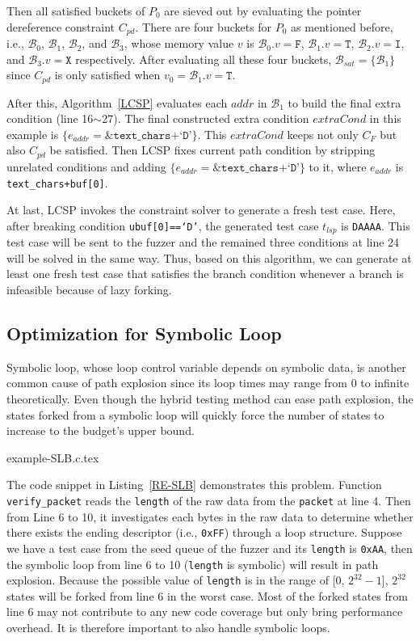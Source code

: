 \documentclass{cta-author}
\begin{document}
Then all satisfied buckets of $P_0$ are sieved out by evaluating the 
pointer dereference constraint $C_{pd}$. 
There are four buckets for $P_0$ as mentioned before, i.e., $\mathcal{B}_0$, $\mathcal{B}_1$, $\mathcal{B}_2$, and $\mathcal{B}_3$, whose memory value
$v$ is $\mathcal{B}_0.v=\texttt{F}$, $\mathcal{B}_1.v=\texttt{T}$, $\mathcal{B}_2.v=\texttt{I}$, and $\mathcal{B}_3.v=\texttt{X}$ respectively. 
After evaluating all these four buckets, $\mathcal{B}_{sat}=\{\mathcal{B}_1\}$ since
$C_{pd}$ is only satisfied when $v_0 = \mathcal{B}_1.v=\texttt{T}$.

After this, Algorithm~\ref{LCSP} evaluates each $addr$ in $\mathcal{B}_1$ to build the final extra condition (line 16$\sim$27). The final constructed extra
condition $extraCond$ in this example is $\{e_{addr} = \texttt{\&text\_chars+`D'}\}$.
This $extraCond$ keeps not only $C_F$ but also $C_{pd}$ be satisfied.
Then LCSP fixes current path condition by stripping unrelated conditions and adding
$\{e_{addr} = \texttt{\&text\_chars+`D'}\}$ to it, where $e_{addr}$ is \texttt{text\_chars+buf[0]}.

At last, LCSP invokes the constraint solver to 
generate a fresh test case. Here, after breaking condition \texttt{ubuf[0]==`D'}, the 
generated test case $t_{lsp}$ is \texttt{DAAAA}. This test case will be sent to the fuzzer and the
remained three conditions at line 24 will be solved in the same way. Thus, based on this algorithm, we can generate at least one fresh test case 
that satisfies the branch condition whenever a branch is infeasible 
because of lazy forking. 

\subsection{Optimization for Symbolic Loop}
Symbolic loop, whose loop control variable depends on symbolic data, 
is another common cause of path explosion since its loop times may 
range from 0 to infinite theoretically. 
Even though the hybrid testing method can ease path explosion, the 
states forked from a symbolic loop will quickly force the number of 
states to increase to the budget's upper bound. 


{example-SLB.c.tex} 

The code snippet in Listing~\ref{RE-SLB} demonstrates this problem. 
Function \texttt{verify\_packet} reads the \texttt{length} of the 
raw data from the \texttt{packet} at line 4.
Then from Line 6 to 10, it investigates each bytes in the raw data 
to determine whether there exists the ending descriptor 
(i.e., \texttt{0xFF}) through a loop structure. 
Suppose we have a test case from the seed queue of 
the fuzzer and its \texttt{length} is \texttt{0xAA}, 
then the symbolic loop 
from line 6 to 10 (\texttt{length} is symbolic) 
will result in path explosion.
Because the possible value of \texttt{length} is in the 
range of [0, $2^{32}-1$], $2^{32}$ states will be forked from 
line 6 in the worst case. 
Most of the forked states from line 6 may not contribute 
to any new code coverage but only bring performance overhead.
It is therefore important to also handle symbolic loops. 
\end{document}
